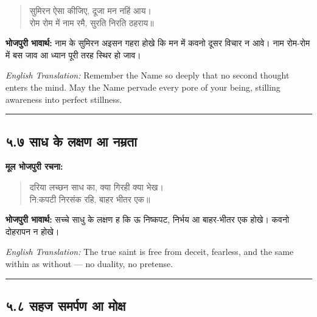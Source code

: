 \begin{quote}
सुमिरन ऐसा कीजिए, दूजा मन नहिं आय।\\
रोम रोम में नाम रमै, सुरति निरति ठहराय॥
\end{quote}

\textbf{भोजपुरी भावार्थ:} नाम के सुमिरन अइसन गहरा होखे कि मन में कवनो दूसर विचार न आवे। नाम रोम-रोम में बस जाव आ ध्यान पूरी तरह स्थिर हो जाव।

\begin{sloppypar}
{\engfont \textit{English Translation:} Remember the Name so deeply that no second thought enters the mind.
May the Name pervade every pore of your being, stilling awareness into perfect stillness.}
\end{sloppypar}

\begin{center}
{\color{bordercolor}\rule{0.4\textwidth}{0.4pt}}
\end{center}

\subsection*{५.७ साध के लक्षण आ नम्रता}

\textbf{मूल भोजपुरी रचना:}

\begin{quote}
दरिया लच्छन साध का, क्या गिरही क्या भेख।\\
नि:कपटी निरसंक रहि, बाहर भीतर एक॥
\end{quote}

\textbf{भोजपुरी भावार्थ:} सच्चे साधु के लक्षण ह कि ऊ निष्कपट, निर्भय आ बाहर-भीतर एक होखे। कवनो दोहरापन न होखे।

\begin{sloppypar}
{\engfont \textit{English Translation:} The true saint is free from deceit, fearless, and the same within as without --- no duality, no pretense.}
\end{sloppypar}

\begin{center}
{\color{bordercolor}\rule{0.4\textwidth}{0.4pt}}
\end{center}

\subsection*{५.८ सहज समर्पण आ मोक्ष}

